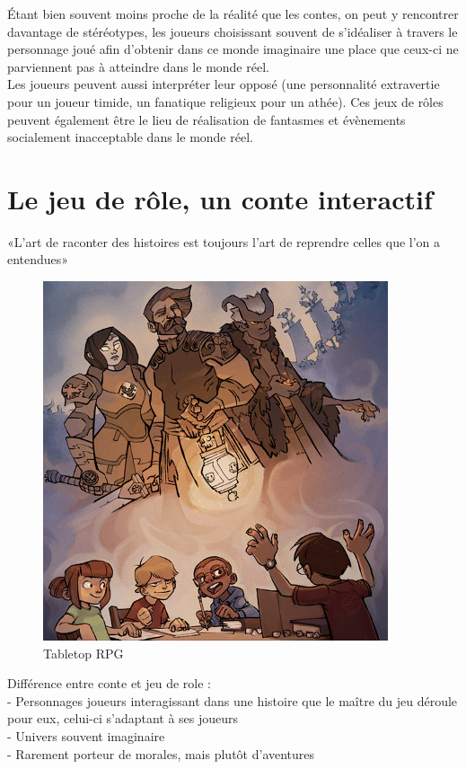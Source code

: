 \documentclass[a4paper,12pt,final,oneside]{article}
\begin{document}
Étant bien souvent moins proche de la réalité que les contes, on peut y rencontrer davantage de stéréotypes, les joueurs choisissant souvent de s'idéaliser à travers le personnage joué afin d'obtenir dans ce monde imaginaire une place que ceux-ci ne parviennent pas à atteindre dans le monde réel.\\
Les joueurs peuvent aussi interpréter leur opposé (une personnalité extravertie pour un joueur timide, un fanatique religieux pour un athée). Ces jeux de rôles peuvent également être le lieu de réalisation de fantasmes et évènements socialement inacceptable dans le monde réel.



\clearpage

\section{Le jeu de rôle, un conte interactif}

«L'art de raconter des histoires est toujours l'art de reprendre celles que l'on a entendues»\\

\begin{figure}[h!]
    \centering
    \includegraphics[width=0.80\linewidth]{img/rpg_tabletop2.jpg}
    \caption{Tabletop RPG}
\end{figure}

Différence entre conte et jeu de role : \\
- Personnages joueurs interagissant dans une histoire que le maître du jeu déroule pour eux, celui-ci s'adaptant à ses joueurs\\
- Univers souvent imaginaire\\
- Rarement porteur de morales, mais plutôt d'aventures\\
\end{document}
